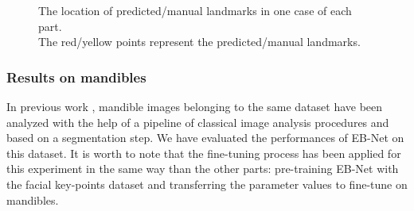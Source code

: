\documentclass[review]{elsarticle}
\begin{document}
\begin{figure}[h!]
    \centering
    \caption{The location of predicted/manual landmarks in one case of each part.\\The red/yellow points represent the predicted/manual landmarks.}
    \label{figpdl}
\end{figure}

\subsubsection{Results on mandibles}
In previous work \cite{le2017maelab}, mandible images belonging to the
same dataset have been
analyzed with the help of a pipeline of classical image analysis
procedures and  based on a segmentation step. We have evaluated the performances of EB-Net on this dataset. It is worth to note that the fine-tuning process has been applied for this experiment in the same way than the other parts: pre-training EB-Net with the facial key-points dataset and transferring the parameter values to fine-tune on mandibles.
\end{document}
